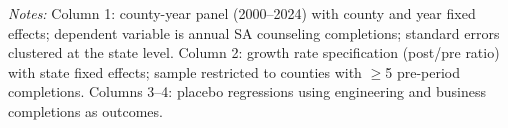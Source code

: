 \begin{table}[htbp]
   \par \raggedright 
   \textit{Notes:} Column 1: county-year panel (2000--2024) with county and year fixed effects; dependent variable is annual SA counseling completions; standard errors clustered at the state level. Column 2: growth rate specification (post/pre ratio) with state fixed effects; sample restricted to counties with $\geq$5 pre-period completions. Columns 3--4: placebo regressions using engineering and business completions as outcomes.
\end{table}


